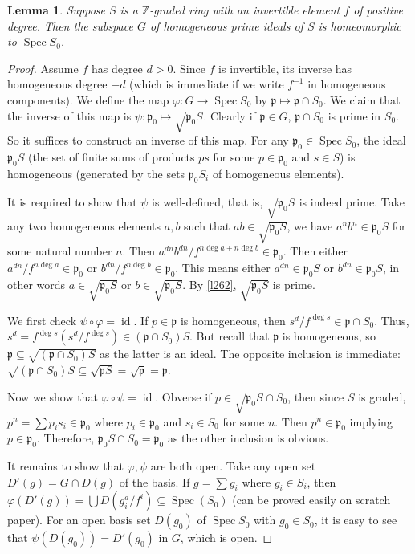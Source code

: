 \documentclass[12pt]{article}
\newtheorem{lemma}{Lemma}[subsection]
\theoremstyle{remark}
\newcommand{\Z}[0]{\mathbb{Z}}
\newcommand{\Spec}[0]{\operatorname{Spec}}
\newcommand{\id}[0]{\operatorname{id}}
\begin{document}
	\begin{lemma}\label{l263}
		Suppose $S$ is a $\Z$-graded ring with an invertible element $f$ of positive degree. Then the subspace $G$ of homogeneous prime ideals of $S$ is homeomorphic to $\Spec S_0$.
	\end{lemma}
	\begin{proof}
		Assume $f$ has degree $d>0$. Since $f$ is invertible, its inverse has homogeneous degree $-d$ (which is immediate if we write $f^{-1}$ in homogeneous components). We define the map $\varphi:G\to\Spec S_0$ by $\mathfrak p\mapsto\mathfrak p\cap S_0$. We claim that the inverse of this map is $\psi:\mathfrak p_0\mapsto \sqrt{\mathfrak p_0S}$. Clearly if $\mathfrak p \in G$, $\mathfrak p\cap S_0$ is prime in $S_0$. So it suffices to construct an inverse of this map. For any $\mathfrak p_0\in \Spec S_0$, the ideal $\mathfrak p_0S$ (the set of finite sums of products $ps$ for some $p\in\mathfrak p_0$ and $s\in S$) is homogeneous (generated by the sets $\mathfrak p_0 S_i$ of homogeneous elements).

		It is required to show that $\psi$ is well-defined, that is, $\sqrt{\mathfrak p_0S}$ is indeed prime. Take any two homogeneous elements $a, b$ such that $ab\in \sqrt{\mathfrak p_0S}$, we have $a^nb^n\in\mathfrak p_0S$ for some natural number $n$. Then $a^{dn}b^{dn}/f^{n\deg a+n\deg b}\in\mathfrak p_0$. Then either $a^{dn}/f^{n\deg a}\in\mathfrak p_0$ or $b^{dn}/f^{n\deg b}\in\mathfrak p_0$. This means either $a^{dn}\in\mathfrak p_0S$ or $b^{dn}\in\mathfrak p_0S$, in other words $a\in \sqrt{\mathfrak p_0S}$ or $b\in\sqrt{\mathfrak p_0S}$. By \autoref{l262}, $\sqrt{\mathfrak p_0S}$ is prime.
		
		We first check $\psi\circ\varphi=\id$. If $p\in\mathfrak p$ is homogeneous, then $s^d/f^{\deg s}\in \mathfrak p\cap S_0$. Thus, $s^d=f^{\deg s}(s^d/f^{\deg s})\in(\mathfrak p\cap S_0)S$. But recall that $\mathfrak p$ is homogeneous, so $\mathfrak p\subseteq \sqrt{(\mathfrak p\cap S_0)S}$ as the latter is an ideal. The opposite inclusion is immediate: $\sqrt{(\mathfrak p\cap S_0)S}\subseteq\sqrt{\mathfrak pS}=\sqrt{\mathfrak p}=\mathfrak p$.
	
		Now we show that $\varphi\circ\psi=\id$. Obverse if $p\in\sqrt{\mathfrak p_0S}\cap S_0$, then since $S$ is graded, $p^n=\sum p_is_i\in\mathfrak p_0$ where $p_i\in\mathfrak p_0$ and $s_i\in S_0$ for some $n$. Then $p^n\in\mathfrak p_0$ implying $p\in\mathfrak p_0$. Therefore, $\mathfrak p_0S\cap S_0=\mathfrak p_0$ as the other inclusion is obvious.

		It remains to show that $\varphi,\psi$ are both open. Take any open set $D'(g)=G\cap D(g)$ of the basis. If $g=\sum g_i$ where $g_i\in S_i$, then $\varphi(D'(g))=\bigcup D(g_i^d/f^i)\subseteq\Spec(S_0)$ (can be proved easily on scratch paper). For an open basis set $D(g_0)$ of $\Spec S_0$ with $g_0\in S_0$, it is easy to see that $\psi(D(g_0))=D'(g_0)$ in $G$, which is open.
	\end{proof}
\end{document}
